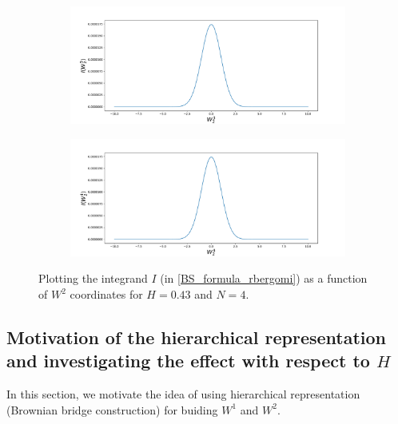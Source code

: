 \documentclass[11pt]{article}
\begin{document}
\begin{figure}[h!]
	\begin{subfigure}[b]{0.475\textwidth}
		\centering
		\includegraphics[width=1\linewidth]{./figures/integrand_plotting_rBergomi/1D_plots/N_4/H_043/Bergomi_integrand_K_1_H_043_W23_N_4}
		\caption{}
		\label{fig:sub3}
	\end{subfigure}
	\hfill
	\begin{subfigure}[b]{0.475\textwidth}
		\centering
		\includegraphics[width=1\linewidth]{./figures/integrand_plotting_rBergomi/1D_plots/N_4/H_043/Bergomi_integrand_K_1_H_043_W24_N_4}
		\caption{}
		\label{fig:sub4}
	\end{subfigure}
	\caption{Plotting the integrand $I$ (in \eqref{BS_formula_rbergomi}) as a function of $W^2$ coordinates for $H=0.43$ and $N=4$.}
	
	\label{fig:Integrand_H_043_N_4_W_2_1}
\end{figure}


\newpage




\subsection{Motivation of the hierarchical representation and investigating the effect with respect to $H$ }\label{sec:mixed differences rbergomi_wrt_H}
In this section, we motivate the idea of using hierarchical representation (Brownian bridge construction) for buiding $W^1$ and $W^2$. 
\end{document}
